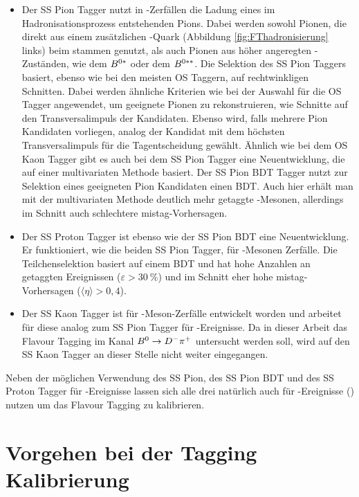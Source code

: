 \begin{itemize}
\item Der SS Pion Tagger nutzt in \Bz-Zerfällen die Ladung eines im Hadronisa\-tionsprozess entstehenden Pions. Dabei werden sowohl Pionen, die direkt aus einem zusätzlichen \dquark-Quark (Abbildung \ref{fig:FThadronisierung} links) beim \Bz stammen genutzt, als auch Pionen aus höher angeregten \B-Zuständen, wie dem {{\ensuremath{\B^{0*}}}\xspace} oder dem {{\ensuremath{\B^{0**}}}\xspace}. Die Selektion des SS Pion Taggers basiert, ebenso wie bei den meisten OS Taggern, auf rechtwinkligen Schnitten. Dabei werden ähnliche Kriterien wie bei der Auswahl für die OS Tagger angewendet, um geeignete Pionen zu rekonstruieren, wie Schnitte auf den Transversalimpuls der Kandidaten. Ebenso wird, falls mehrere Pion Kandidaten vorliegen, analog der Kandidat mit dem höchsten Transversalimpuls \pt  für die Tagentscheidung gewählt. Ähnlich wie bei dem OS Kaon Tagger gibt es auch bei dem SS Pion Tagger eine Neuentwicklung, die auf einer multivariaten Methode basiert. Der SS Pion BDT Tagger nutzt zur Selektion  eines geeigneten Pion Kandidaten einen BDT. Auch hier erhält man mit der multivariaten Methode deutlich mehr getaggte \B-Mesonen, allerdings im Schnitt auch schlechtere mistag-Vorhersagen.
\item Der SS Proton Tagger ist ebenso wie der SS Pion BDT eine Neuentwicklung. Er funktioniert, wie die beiden SS Pion Tagger, für \Bz-Mesonen Zerfälle. Die Teilchenselektion basiert auf einem BDT und hat hohe Anzahlen an getaggten Ereignissen ($\varepsilon>\SI{30}{\%}$) und im Schnitt eher hohe mistag-Vorhersagen ($\langle\eta\rangle>0{,}4$).
\item Der SS Kaon Tagger ist für \Bs-Meson-Zerfälle entwickelt worden und arbeitet für diese analog zum SS Pion Tagger für \Bz-Ereignisse. Da in dieser Arbeit das Flavour Tagging im Kanal ${{B}^0}\rightarrow{\ensuremath{{D}^-}}{\ensuremath{{\pi}^+}}$ untersucht werden soll, wird auf den SS Kaon Tagger an dieser Stelle nicht weiter eingegangen.
\end{itemize}
Neben der möglichen Verwendung des SS Pion, des SS Pion BDT und des SS Proton Tagger für \Bz-Ereignisse lassen sich alle drei natürlich auch für \Bu-Ereignisse (\bquarkbar\uquark) nutzen um das Flavour Tagging zu kalibrieren. 

\section{Vorgehen bei der Tagging Kalibrierung}

